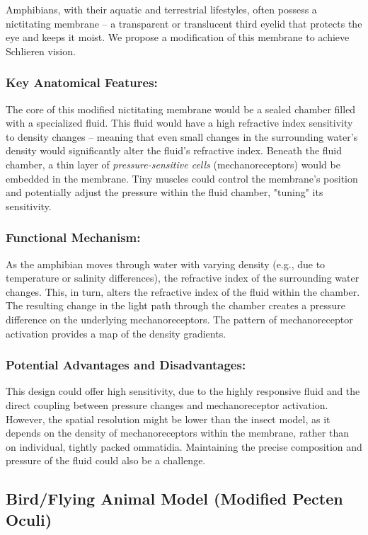 \documentclass[11pt]{article}
\begin{document}
Amphibians, with their aquatic and terrestrial lifestyles, often possess a nictitating membrane \cite{Walls1942VertebrateEye} – a transparent or translucent third eyelid that protects the eye and keeps it moist. We propose a modification of this membrane to achieve Schlieren vision.

\subsubsection{Key Anatomical Features:}
The core of this modified nictitating membrane would be a sealed chamber filled with a specialized fluid. This fluid would have a high refractive index sensitivity to density changes – meaning that even small changes in the surrounding water's density would significantly alter the fluid's refractive index. Beneath the fluid chamber, a thin layer of \textit{pressure-sensitive cells} (mechanoreceptors) would be embedded in the membrane. Tiny muscles could control the membrane's position and potentially adjust the pressure within the fluid chamber, "tuning" its sensitivity.

\subsubsection{Functional Mechanism:}
As the amphibian moves through water with varying density (e.g., due to temperature or salinity differences), the refractive index of the surrounding water changes. This, in turn, alters the refractive index of the fluid within the chamber. The resulting change in the light path through the chamber creates a pressure difference on the underlying mechanoreceptors. The pattern of mechanoreceptor activation provides a map of the density gradients.

\subsubsection{Potential Advantages and Disadvantages:}
This design could offer high sensitivity, due to the highly responsive fluid and the direct coupling between pressure changes and mechanoreceptor activation. However, the spatial resolution might be lower than the insect model, as it depends on the density of mechanoreceptors within the membrane, rather than on individual, tightly packed ommatidia. Maintaining the precise composition and pressure of the fluid could also be a challenge.

\subsection{Bird/Flying Animal Model (Modified Pecten Oculi)}
\end{document}
